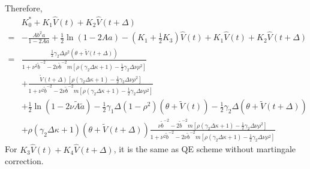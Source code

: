 \documentclass{ws-ijfe}
\begin{document}
Therefore,
\begin{equation*}
  \begin{split}
    &K_0^*+K_1\hat{V}(t)+K_2\hat{V}(t+\Delta)\\
    =&-\frac{Ab^2a}{1-2Aa}+\frac{1}{2}\ln(1-2Aa)-(K_1+\frac{1}{2}K_3)\hat{V}(t)+K_1\hat{V}(t)+K_2\hat{V}(t+\Delta)\\
  =&\frac{\frac{1}{2}\gamma_2\Delta\rho^2(\theta+\tilde{V}(t+\Delta))}{1+\nu^2\tilde{b}^{-2}-2\nu\tilde{b}^{-2}m[\rho(\gamma_2\Delta\kappa+1)-\frac{1}{2}\gamma_2\Delta\nu\rho^2]}\\
  &+\frac{\mathring{V}(t+\Delta)[\rho(\gamma_2\Delta\kappa+1)-\frac{1}{2}\gamma_2\Delta\nu\rho^2]}{1+\nu^2\tilde{b}^{-2}-2\nu\tilde{b}^{-2}m[\rho(\gamma_2\Delta\kappa+1)-\frac{1}{2}\gamma_2\Delta\nu\rho^2]}\\
  &+\frac{1}{2}\ln(1-2\nu\tilde{A}\tilde{a})-\frac{1}{2}\gamma_1\Delta(1-\rho^2)(\theta+\tilde{V}(t))-\frac{1}{2}\gamma_2\Delta(\theta+\tilde{V}(t+\Delta))\\
  &+\rho(\gamma_2\Delta\kappa+1)(\theta+\tilde{V}(t+\Delta))\frac{\nu\tilde{b}^{-2}-2\tilde{b}^{-2}m[\rho(\gamma_2\Delta\kappa+1)-\frac{1}{2}\gamma_2\Delta\nu\rho^2]}{1+\nu^2\tilde{b}^{-2}-2\nu\tilde{b}^{-2}m[\rho(\gamma_2\Delta\kappa+1)-\frac{1}{2}\gamma_2\Delta\nu\rho^2]}
\end{split}
\end{equation*}
For $K_3\hat{V}(t)+K_4\hat{V}(t+\Delta)$, it is the same as QE scheme without martingale correction.\\
\end{document}
